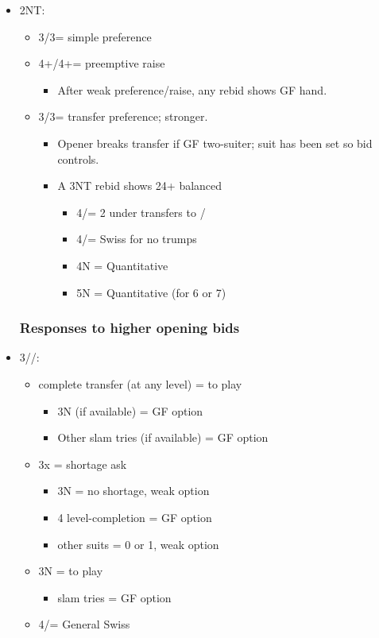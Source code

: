 \documentclass[a4paper,14pt]{extarticle}
\begin{document}
\begin{itemize}
\item 2NT:
	\begin{itemize}
   \item 3\diamonds/3\spades = simple preference
   \item 4+\diamonds/4+\spades = preemptive raise
		\begin{itemize}
      \item After weak preference/raise, any rebid shows GF hand.
		\end{itemize}
   \item 3\clubs/3\hearts = transfer preference; stronger.
		\begin{itemize}
      \item Opener breaks transfer if GF two-suiter; suit has been set so bid controls.
      \item A 3NT rebid shows 24+ balanced
			\begin{itemize}
         \item 4\clubs/\diamonds = 2 under transfers to \hearts/\spades
         \item 4\hearts/\spades = Swiss for no trumps 
         \item 4N = Quantitative
         \item 5N = Quantitative (for 6 or 7)
			\end{itemize}
		\end{itemize}
	\end{itemize}

\newpage

\subsubsection{Responses to higher opening bids}
\label{sec:resp:higher}

\item 3\clubs/\diamonds/\hearts:
	\begin{itemize}
	\item complete transfer (at any level) = to play
		\begin{itemize}
		\item 3N (if available) = GF option
		\item Other slam tries (if available) = GF option
		\end{itemize}
	\item 3x = shortage ask
		\begin{itemize}
		\item 3N = no shortage, weak option
		\item 4 level-completion = GF option
		\item other suits = 0 or 1, weak option
		\end{itemize}
	\item 3N = to play
		\begin{itemize}
		\item slam tries = GF option
		\end{itemize}
	\item 4\clubs/\diamonds = General Swiss~
	\end{itemize}


\end{itemize}
\end{document}

